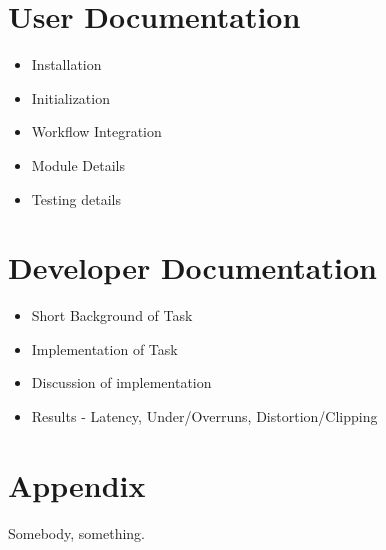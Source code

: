 \documentclass[a4paper,12pt]{report}
\begin{document}
\chapter{User Documentation}


\begin{itemize}
    \item Installation
    \item Initialization
    \item Workflow Integration
    \item Module Details
    \item Testing details
\end{itemize}



\chapter{Developer Documentation}


\begin{itemize}
    \item Short Background of Task
    \item Implementation of Task
    \item Discussion of implementation
    \item Results - Latency, Under/Overruns, Distortion/Clipping
\end{itemize}



\chapter{Appendix}


\begin{thebibliography}{9}
 Somebody, something.
\end{thebibliography}
\end{document}
